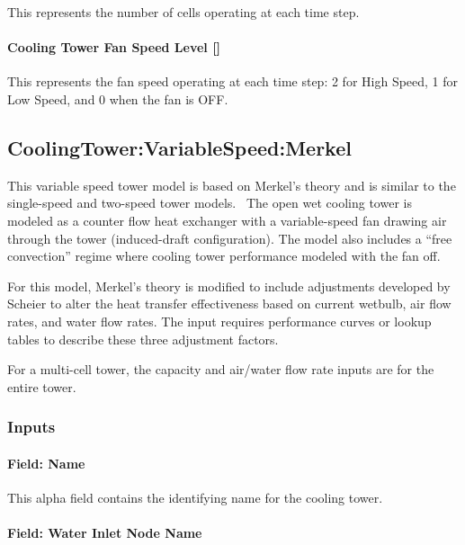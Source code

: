 This represents the number of cells operating at each time step.

\paragraph{Cooling Tower Fan Speed Level {[]}}\label{cooling-tower-fan-speed-level}

This represents the fan speed operating at each time step: 2 for High Speed, 1 for Low Speed, and 0 when the fan is OFF.

\subsection{CoolingTower:VariableSpeed:Merkel}\label{coolingtowervariablespeedmerkel}

This variable speed tower model is based on Merkel's theory and is similar to the single-speed and two-speed tower models.~ The open wet cooling tower is modeled as a counter flow heat exchanger with a variable-speed fan drawing air through the tower (induced-draft configuration). The model also includes a ``free convection'' regime where cooling tower performance modeled with the fan off.

For this model, Merkel's theory is modified to include adjustments developed by Scheier to alter the heat transfer effectiveness based on current wetbulb, air flow rates, and water flow rates. The input requires performance curves or lookup tables to describe these three adjustment factors.

For a multi-cell tower, the capacity and air/water flow rate inputs are for the entire tower.

\subsubsection{Inputs}\label{inputs-2-006}

\paragraph{Field: Name}\label{field-name-1-005}

This alpha field contains the identifying name for the cooling tower.

\paragraph{Field: Water Inlet Node Name}\label{field-water-inlet-node-name-2}

